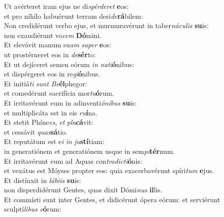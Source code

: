\evenverse Ut avérteret iram ejus ne di\textit{spér}\textit{de}\textit{ret} \textbf{e}os:~\*\\
\evenverse et pro níhilo habuérunt terram desi\textit{de}\textbf{rá}bilem:\\
\oddverse Non credidérunt verbo ejus, et murmuravérunt in taber\textit{ná}\textit{cu}\textit{lis} \textbf{su}is:~\*\\
\oddverse non exaudiérunt vo\textit{cem} \textbf{Dó}mini.\\
\evenverse Et elevávit manum su\textit{am} \textit{su}\textit{per} \textbf{e}os:~\*\\
\evenverse ut prostérneret eos in \textit{de}\textbf{sér}to:\\
\oddverse Et ut dejíceret semen eórum \textit{in} \textit{na}\textit{ti}\textbf{ó}nibus:~\*\\
\oddverse et dispérgeret eos in re\textit{gi}\textbf{ó}nibus.\\
\evenverse Et initiá\textit{ti} \textit{sunt} \textit{Be}\textbf{él}phegor:~\*\\
\evenverse et comedérunt sacrifícia mor\textit{tu}\textbf{ó}rum.\\
\oddverse Et irritavérunt eum in adinventi\textit{ó}\textit{ni}\textit{bus} \textbf{su}is:~\*\\
\oddverse et multiplicáta est in eis \textit{ru}\textbf{í}na.\\
\evenverse Et stetit Phíne\textit{es}, \textit{et} \textit{pla}\textbf{cá}vit:~\*\\
\evenverse et cessávit \textit{quas}\textbf{sá}tio.\\
\oddverse Et reputátum est e\textit{i} \textit{in} \textit{ju}\textbf{stí}tiam:~\*\\
\oddverse in generatiónem et generatiónem usque in sem\textit{pi}\textbf{tér}num.\\
\evenverse Et irritavérunt eum ad Aquas con\textit{tra}\textit{di}\textit{cti}\textbf{ó}nis:~\*\\
\evenverse et vexátus est Móyses propter eos: quia exacerbavérunt spíri\textit{tum} \textbf{e}jus.\\
\oddverse Et distínxit in \textit{lá}\textit{bi}\textit{is} \textbf{su}is:~\*\\
\oddverse non disperdidérunt Gentes, quas dixit Dómi\textit{nus} \textbf{il}lis.\\
\evenverse Et commísti sunt inter Gentes, et didicérunt ópera eórum: et serviérunt sculptí\textit{li}\textit{bus} \textit{e}\textbf{ó}rum:~\*\\
